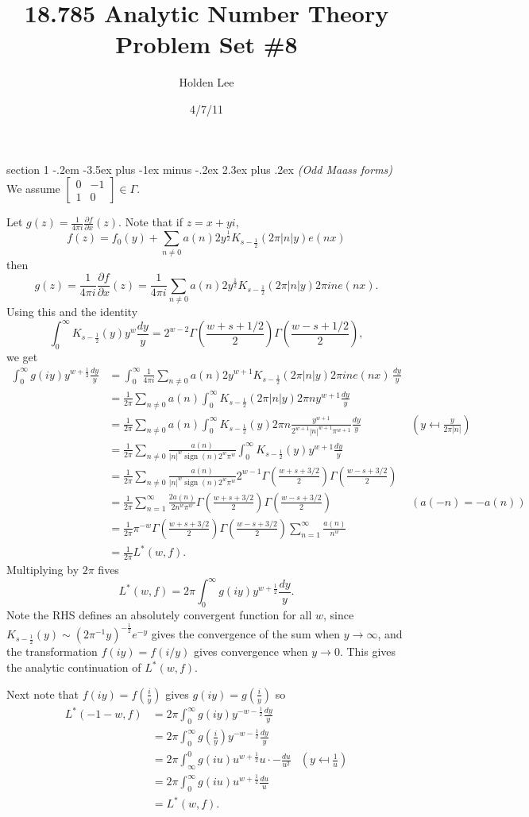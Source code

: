 \documentclass[12pt]{article}
\makeatletter
\theoremstyle{norm}
\newcommand{\rc}[1]{\frac{1}{#1}}
\newcommand{\Ga}[0]{\Gamma}
\newcommand{\pa}[1]{\left( {#1} \right)}
\newcommand{\sign}{\operatorname{sign}}
\newcommand{\pf}[2]{\pa{\frac{#1}{#2}}}
\newcommand{\pd}[2]{\frac{\partial #1}{\partial #2}}
\newcommand{\smatt}[4]{
\left[
\begin{smallmatrix}
{#1}&{#2}\\
{#3}&{#4}
\end{smallmatrix}
\right]}
\newcommand{\iy}[0]{\infty}
\newenvironment{problem}{\@startsection
       {section}
       {1}
       {-.2em}
       {-3.5ex plus -1ex minus -.2ex}
       {2.3ex plus .2ex}
       {\pagebreak[3]%
       \large\bf\noindent{Problem }
       }
       }
       {%
       }
\makeatother
\begin{document}
\title{18.785 Analytic Number Theory Problem Set \#8}%
\author{Holden Lee}
\date{4/7/11}%
\maketitle
\thispagestyle{empty}

\begin{problem}{\it (Odd Maass forms)}
We assume $\smatt 0{-1}10\in \Ga$.

Let $g(z)=\rc{4\pi i} \pd fx(z)$. Note that if $z=x+yi$,
\[
f(z)=f_0(y)+\sum_{n\ne 0}a(n)2y^{\rc 2} K_{s-\rc 2}(2\pi |n|y)e(nx)
\]
then
\[
g(z)=\rc{4\pi i}\pd fx (z)=\rc{4\pi i}\sum_{n\ne 0} a(n)2y^{\rc 2}K_{s-\rc 2} (2\pi |n|y) 2\pi ine(nx).
\]
Using this and the identity
\[
\int_0^{\iy} K_{s-\rc2}(y)y^w\frac{dy}{y}=2^{w-2} \Ga\pf{w+s+1/2}2\Ga\pf{w-s+1/2}2,
\]
we get
\begin{align*}
\int_0^{\iy} g(iy) y^{w+\rc2}\frac{dy}{y}
&=\int_0^{\iy}\rc{4\pi i}\sum_{n\ne 0} a(n)2y^{w+1}K_{s-\rc 2} (2\pi |n|y) 2\pi ine(nx)\,\frac{dy}y\\
&=\rc{2\pi } \sum_{n\ne 0}a(n)\int_0^{\iy} K_{s-\rc 2}(2\pi |n|y)2\pi ny^{w+1}\frac{dy}y\\
&=\rc{2\pi } \sum_{n\ne 0}a(n)\int_0^{\iy} K_{s-\rc 2}(y) 2\pi n\frac{y^{w+1}}{2^{w+1}|n|^{w+1}\pi^{w+1}}\frac{dy}y
&\pa{y\mapsfrom \frac{y}{2\pi |n|}}\\
&=\rc{2\pi}\sum_{n\neq 0} \frac{a(n)}{|n|^w \sign(n)2^{w}\pi^{w}}\int_0^{\iy} K_{s-\rc 2}(y) y^{w+1}\frac{dy}{y}\\
&=\rc{2\pi}\sum_{n\ne 0} \frac{a(n)}{|n|^w \sign(n)2^{w}\pi^{w}} 2^{w-1}\Ga\pf{w+s+3/2}2\Ga\pf{w-s+3/2}2\\
&=\rc{2\pi}\sum_{n=1}^{\iy}\frac{2a(n)}{2n^w\pi^w}\Ga\pf{w+s+3/2}2\Ga\pf{w-s+3/2}2&(a(-n)=-a(n))\\
&=\rc{2\pi}\pi^{-w}\Ga\pf{w+s+3/2}2\Ga\pf{w-s+3/2}2\sum_{n=1}^{\iy} \frac{a(n)}{n^w}\\
&=\rc{2\pi} L^*(w,f).
\end{align*}
Multiplying by $2\pi$ fives
\[
L^*(w,f)=2\pi \int_0^{\iy} g(iy)y^{w+\rc2}\frac{dy}{y}.
\]
Note the RHS defines an absolutely convergent function for all $w$, since $K_{s-\rc 2}(y)\sim (2\pi^{-1}y)^{-\rc 2} e^{-y}$ gives the convergence of the sum when $y\to \iy$, and the transformation $f(iy)=f(i/y)$ gives convergence when $y\to 0$. This gives the analytic continuation of $L^*(w,f)$.

Next note that $f(iy)=f\pf iy$ gives $g(iy)=g\pf iy$ so
\begin{align*}
L^*(-1-w,f)&=2\pi \int_0^{\iy} g(iy) y^{-w-\rc2}\frac{dy}{y}\\
&=2\pi \int_0^{\iy} g\pf iy y^{-w-\rc 2}\frac{dy}{y}\\
&=2\pi \int_{\iy}^0 g(iu) u^{w+\rc 2} u\cdot -\frac{du}{u^2}&\pa{y\mapsfrom \rc u}\\
&=2\pi \int_0^{\iy} g(iu) u^{w+\rc 2}\frac{du}{u}\\
&=L^*(w,f).
\end{align*}
\end{problem}
\end{document}
